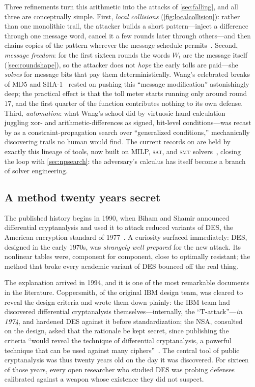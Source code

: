 Three refinements turn this arithmetic into the attacks of
\cref{sec:falling}, and all three are conceptually simple. First,
\emph{local collisions} (\cref{fig:localcollision}): rather than one
monolithic trail, the attacker builds a short pattern---inject a
difference through one message word, cancel it a few rounds later
through others---and then chains copies of the pattern wherever the
message schedule permits~\citep{ChabaudJoux1998}. Second, \emph{message
freedom}: for the first sixteen rounds the words $W_t$ are the message
itself (\cref{sec:roundshape}), so the attacker does not \emph{hope}
the early tolls are paid---she \emph{solves} for message bits that pay
them deterministically. Wang's celebrated breaks of MD5 and
SHA-1~\citep{WangYu2005, WangYinYu2005} rested on pushing this
``message modification'' astonishingly deep; the practical effect is
that the toll meter starts running only around round $17$, and the
first quarter of the function contributes nothing to its own defense.
Third, \emph{automation}: what Wang's school did by virtuosic hand
calculation---juggling xor- and arithmetic-differences as signed,
bit-level conditions---was recast by \citet{DeCanniereRechberger2006}
as a constraint-propagation search over ``generalized conditions,''
mechanically discovering trails no human would find. The current
records on \SHA{} are held by exactly this lineage of tools, now
built on MILP, \textsc{sat}, and \textsc{smt}
solvers~\citep{MendelNadSchlaffer2013, LiLiuWang2024}, closing the loop
with \cref{sec:npsearch}: the adversary's calculus has itself become a
branch of solver engineering.

\subsection{A method twenty years secret}\label{sec:secrethistory}

The published history begins in 1990, when Biham and Shamir announced
differential cryptanalysis and used it to attack reduced variants of
DES, the American encryption standard of
1977~\citep{BihamShamir1991}. A curiosity surfaced immediately: DES,
designed in the early 1970s, was \emph{strangely well prepared} for the
new attack. Its nonlinear tables were, component for component, close
to optimally resistant; the method that broke every academic variant
of DES bounced off the real thing.

The explanation arrived in 1994, and it is one of the most remarkable
documents in the literature. Coppersmith, of the original IBM design
team, was cleared to reveal the design criteria and wrote them down
plainly: the IBM team had discovered differential cryptanalysis
themselves---internally, the ``T-attack''---\emph{in 1974}, and
hardened DES against it before standardization; the NSA, consulted on
the design, asked that the rationale be kept secret, since publishing
the criteria ``would reveal the technique of differential
cryptanalysis, a powerful technique that can be used against many
ciphers''~\citep{Coppersmith1994}. The central tool of public
cryptanalysis was thus twenty years old on the day it was discovered.
For sixteen of those years, every open researcher who studied DES was
probing defenses calibrated against a weapon whose existence they did
not suspect.

